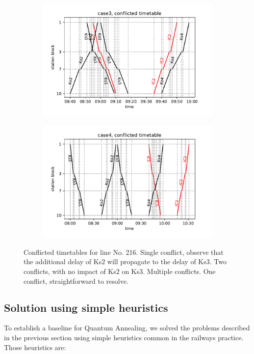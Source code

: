 \begin{figure}
  \begin{subfigure}[b]{0.5\textwidth}
    \caption{} \label{c3}
    \includegraphics[width=\textwidth]{figures/case3_conflict}
  \end{subfigure}
  \begin{subfigure}[b]{0.5\textwidth}
    \caption{}\label{c4}
    \includegraphics[width=\textwidth]{figures/case4_conflict}
  \end{subfigure}
  \caption{Conflicted timetables for line No. 216.  Single conflict, observe that the additional delay of Ks$2$ will propagate to the delay of Ks$3$.
     Two conflicts, with no impact of Ks$2$ on Ks$3$.  Multiple conflicts. 
  One conflict, straightforward to resolve.}
  \label{fig:conflictlarge}
\end{figure}

\subsection{Solution using simple heuristics}
To establish a baseline for Quantum Annealing, we solved the problems described
in the previous section using simple heuristics common in the railways
practice. Those heuristics are:

